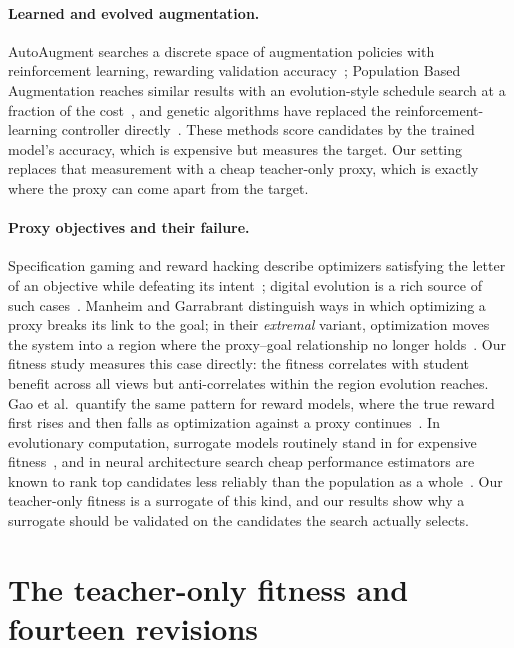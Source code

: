\documentclass[sigconf,review,anonymous]{acmart}
\begin{document}
\paragraph{Learned and evolved augmentation.} AutoAugment searches a
discrete space of augmentation policies with reinforcement learning,
rewarding validation accuracy~\cite{cubuk2019autoaugment}; Population Based
Augmentation reaches similar results with an evolution-style schedule
search at a fraction of the cost~\cite{ho2019pba}, and genetic algorithms
have replaced the reinforcement-learning controller
directly~\cite{terauchi2021evolutionary}. These methods score candidates by
the trained model's accuracy, which is expensive but measures the target.
Our setting replaces that measurement with a cheap teacher-only proxy, which
is exactly where the proxy can come apart from the target.

\paragraph{Proxy objectives and their failure.} Specification gaming and
reward hacking describe optimizers satisfying the letter of an objective
while defeating its intent~\cite{krakovna2020specification,amodei2016concrete,skalse2022hacking};
digital evolution is a rich source of such cases~\cite{lehman2020surprising}.
Manheim and Garrabrant distinguish ways in which optimizing a proxy breaks
its link to the goal; in their \emph{extremal} variant, optimization moves
the system into a region where the proxy--goal relationship no longer
holds~\cite{manheim2018goodhart}. Our fitness study measures this case
directly: the fitness correlates with student benefit across all views but
anti-correlates within the region evolution reaches. Gao et al.\ quantify
the same pattern for reward models, where the true reward first rises and
then falls as optimization against a proxy
continues~\cite{gao2023overoptimization}. In evolutionary computation,
surrogate models routinely stand in for expensive
fitness~\cite{jin2011surrogate}, and in neural architecture search cheap
performance estimators are known to rank top candidates less reliably than
the population as a whole~\cite{ning2021estimators,abdelfattah2021zerocost}.
Our teacher-only fitness is a surrogate of this kind, and our results show
why a surrogate should be validated on the candidates the search actually
selects.

\section{The teacher-only fitness and fourteen revisions}
\label{sec:attempts}
\end{document}
